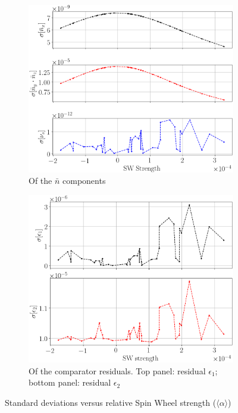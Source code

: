 \documentclass[a4paper]{jacow}
\newcommand{\avg}[1]{\langle {#1} \rangle}
\newcommand{\nbar}{\bar n}
\begin{document}
\begin{figure}[h]
  \centering
  \begin{subfigure}{\linewidth}
    \centering
    \includegraphics[width=\linewidth]{../img/IPAC19/NBAR_variation_sd_vs_SW}
    \caption{Of the $\nbar$ components\label{fig:sd:nbar}}
  \end{subfigure}
  \begin{subfigure}{\linewidth}
    \centering
    \includegraphics[width=\linewidth]{../img/IPAC19/residual_SD_vs_SW(both)}
    \caption{Of the comparator residuals.
      Top panel: residual $\epsilon_1$; bottom panel: residual $\epsilon_2$\label{fig:sd:res}}
  \end{subfigure}
  \caption{Standard deviations versus relative Spin Wheel strength ($\avg{\alpha}$)\label{fig:sd}}
\end{figure}
\end{document}
